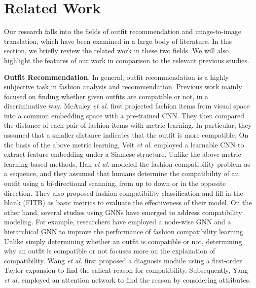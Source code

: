 \section{Related Work}
\label{related_work}
Our research falls into the fields of outfit recommendation and image-to-image translation, which have been examined in a large body of literature.
In this section, we briefly review the related work in these two fields.
We will also highlight the features of our work in comparison to the relevant previous studies.

\textbf{Outfit Recommendation}.
In general, outfit recommendation is a highly subjective task in fashion analysis and recommendation.
Previous work \cite{mcauley2015image, vasileva2018learning,veit2015learning,cui2019dressing, li2020hierarchical,han2017learning, feng2019interpretable,li2017mining,ding2021modeling,zhan2021a3} mainly focused on finding whether given outfits are compatible or not, in a discriminative way.
McAuley \textit{et al.} \cite{mcauley2015image} first projected fashion items from visual space into a common embedding space with a pre-trained CNN.
They then compared the distance of each pair of fashion items with metric learning.
In particular, they assumed that a smaller distance indicates that the outfit is more compatible.
On the basis of the above metric learning, Veit \textit{et al.} \cite{veit2015learning} employed a learnable CNN to extract feature embedding under a Siamese structure.
Unlike the above metric learning-based methods, Han \textit{et al.} \cite{han2017learning} modeled the fashion compatibility problem as a sequence, and they assumed that humans determine the compatibility of an outfit using a bi-directional scanning, from up to down or in the opposite direction.
They also proposed fashion compatibility classification and fill-in-the-blank (FITB) as basic metrics to evaluate the effectiveness of their model.
On the other hand, several studies using GNNs have emerged to address compatibility modeling.
For example, researchers have employed a node-wise GNN\cite{cui2019dressing} and a hierarchical GNN\cite{li2020hierarchical} to improve the performance of fashion compatibility learning.
Unlike simply determining whether an outfit is compatible or not, determining why an outfit is compatible or not focuses more on the explanation of compatibility.
Wang \textit{et al.} \cite{wang2019diagnosis} first proposed a diagnosis module using a first-order Taylor expansion to find the salient reason for compatibility.
Subsequently, Yang \textit{et al.}\cite{yang2021attribute} employed an attention network to find the reason by considering attributes.
